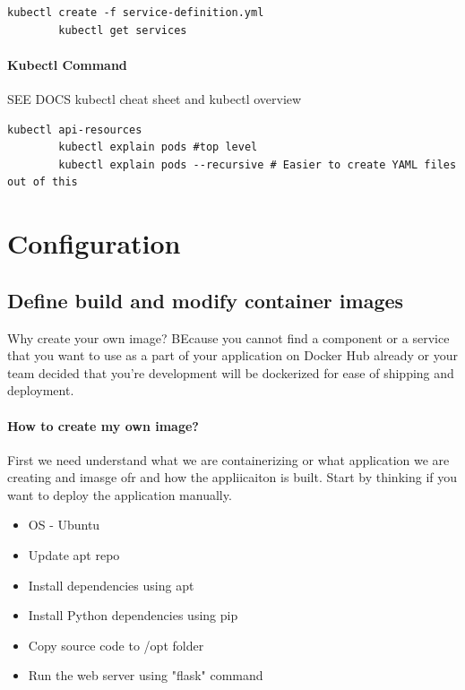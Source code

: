\documentclass[11pt]{book}
\begin{document}
    \begin{lstlisting}[language=terminal,caption={Commands}]
        kubectl create -f service-definition.yml
        kubectl get services
    \end{lstlisting}

    \subsubsection{Kubectl Command}
    SEE DOCS kubectl cheat sheet and kubectl overview

    \begin{lstlisting}[language=terminal,caption={Commands}]
        kubectl api-resources
        kubectl explain pods #top level
        kubectl explain pods --recursive # Easier to create YAML files out of this
    \end{lstlisting}


    \chapter{Configuration}


    \section{Define build and modify container images}
    Why create your own image?
    BEcause you cannot find a component or a service that you want to use as a part of your application on Docker Hub already
    or your team decided that you're development will be dockerized for ease of shipping and deployment.

    \subsubsection{How to create my own image?}
    First we need understand what we are containerizing or what application we are creating and imasge ofr and how the appliicaiton is built.
    Start by thinking if you want to deploy the application manually.

    \begin{itemize}
        \item OS - Ubuntu
        \item Update apt repo
        \item Install dependencies using apt
        \item Install Python dependencies using pip
        \item Copy source code to /opt folder
        \item Run the web server using "flask" command
    \end{itemize}
\end{document}
